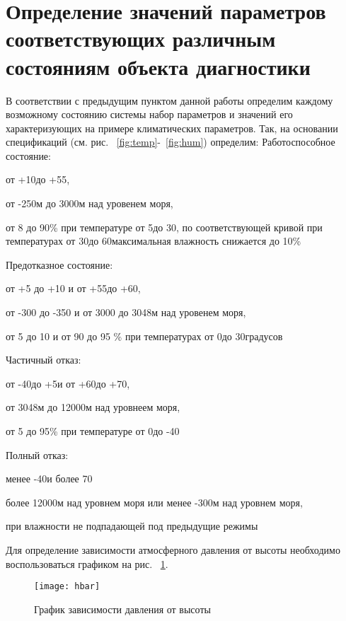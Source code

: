 \section{Определение значений параметров соответствующих различным состояниям объекта диагностики}
В соответствии с предыдущим пунктом данной работы определим каждому возможному состоянию системы набор параметров и значений его характеризующих на примере климатических параметров. Так, на основании спецификаций (см. рис. ~\ref{fig:temp}-~\ref{fig:hum}) определим:
Работоспособное состояние:
\begin{itemize*}
	\item{от +10 до +55,}
	\item{от -250м до 3000м над уровенем моря},
	\item{от 8 до 90\% при температуре от 5 до 30, по соответствующей кривой при температурах от 30 до 60 максимальная влажность снижается до 10\%}
\end{itemize*} 
Предотказное состояние: 
\begin{itemize*}
\item{от +5 до +10 и от +55 до +60,}
\item{от -300 до -350 и от 3000 до 3048м над уровенем моря,}
\item{от 5 до 10 и от 90 до 95 \% при температурах от 0 до 30 градусов}
\end{itemize*} 
Частичный отказ: 
\begin{itemize*}
\item{от -40 до +5 и от +60 до +70,}
\item{от 3048м до 12000м над уровнеем моря, }
\item{ от 5 до 95\% при температуре от 0 до -40}
\end{itemize*} 
Полный отказ: 
\begin{itemize*}
\item{менее -40 и более 70}
\item{более 12000м над уровнем моря или менее -300м над уровнем моря,}
\item{при влажности не подпадающей под предыдущие режимы}
\end{itemize*} 

Для определение зависимости атмосферного давления от высоты необходимо воспользоваться графиком на рис. ~\ref{fig:hbar}.

\begin{figure}[h]
	\centering
	\texttt{[image: hbar]}
	\caption{График зависимости давления от высоты}
	\label{fig:hbar}
\end{figure}

